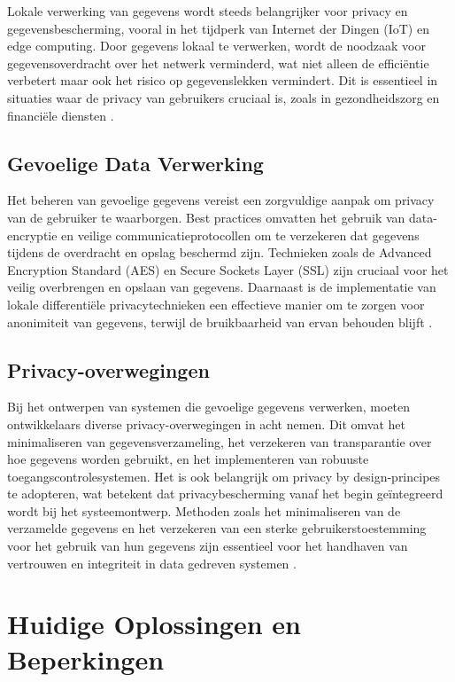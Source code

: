 Lokale verwerking van gegevens wordt steeds belangrijker voor privacy en gegevensbescherming, vooral in het tijdperk van Internet der Dingen (IoT) en edge computing. Door gegevens lokaal te verwerken, wordt de noodzaak voor gegevensoverdracht over het netwerk verminderd, wat niet alleen de efficiëntie verbetert maar ook het risico op gegevenslekken vermindert. Dit is essentieel in situaties waar de privacy van gebruikers cruciaal is, zoals in gezondheidszorg en financiële diensten \autocite{Bi2020}.

\subsection{Gevoelige Data Verwerking}

Het beheren van gevoelige gegevens vereist een zorgvuldige aanpak om privacy van de gebruiker te waarborgen. Best practices omvatten het gebruik van data-encryptie en veilige communicatieprotocollen om te verzekeren dat gegevens tijdens de overdracht en opslag beschermd zijn. Technieken zoals de Advanced Encryption Standard (AES) en Secure Sockets Layer (SSL) zijn cruciaal voor het veilig overbrengen en opslaan van gegevens. Daarnaast is de implementatie van lokale differentiële privacytechnieken een effectieve manier om te zorgen voor anonimiteit van gegevens, terwijl de bruikbaarheid van ervan behouden blijft \autocite{Shah2014}.

\subsection{Privacy-overwegingen}

Bij het ontwerpen van systemen die gevoelige gegevens verwerken, moeten ontwikkelaars diverse privacy-overwegingen in acht nemen. Dit omvat het minimaliseren van gegevensverzameling, het verzekeren van transparantie over hoe gegevens worden gebruikt, en het implementeren van robuuste toegangscontrolesystemen. Het is ook belangrijk om privacy by design-principes te adopteren, wat betekent dat privacybescherming vanaf het begin geïntegreerd wordt bij het systeemontwerp. Methoden zoals het minimaliseren van de verzamelde gegevens en het verzekeren van een sterke gebruikerstoestemming voor het gebruik van hun gegevens zijn essentieel voor het handhaven van vertrouwen en integriteit in data gedreven systemen \autocite{Edwards2019}.


\section{Huidige Oplossingen en Beperkingen}

